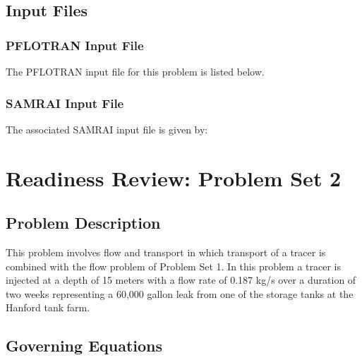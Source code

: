 \documentclass[12pt]{article}
\begin{document}
\subsection{Input Files}

\subsubsection{PFLOTRAN Input File}

The PFLOTRAN input file for this problem is listed below.

\tiny

\normalsize

\subsubsection{SAMRAI Input File}

The associated SAMRAI input file is given by:

\tiny

\normalsize

\section{Readiness Review: Problem Set 2}

\subsection{Problem Description}

This problem involves flow and transport in which transport of a tracer is combined with the flow problem of Problem Set 1. In this problem a tracer is injected at a depth of 15 meters with a flow rate of 0.187 kg/s over a duration of two weeks representing a 60,000 gallon leak from one of the storage tanks at the Hanford tank farm.

\subsection{Governing Equations}
\end{document}
